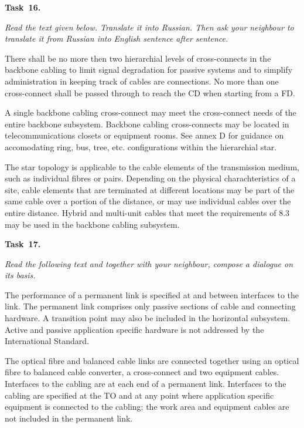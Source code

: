 {\bf Task~16.}~~{\it Read the text given below. Translate it into Russian. Then ask your neighbour to
translate it from Russian into English sentence after sentence. \par}

There shall be no more then two hierarchial levels of cross-connects in the backbone
cabling to limit signal degradation for passive systems and to simplify administration in keeping
track of cables are connections. No more than one cross-connect shall be passed through to reach
the CD when starting from a FD. \par

A single backbone cabling cross-connect may meet the cross-connect needs of the entire
backbone subsystem. Backbone cabling cross-connects may be located in telecommunications
closets or equipment rooms. See annex D for guidance on accomodating ring, bus, tree, etc.
configurations within the hierarchial star.\par

The star topology is applicable to the cable elements of the transmission medium, such as
individual fibres or pairs. Depending on the physical charachteristics of a site, cable elements that
are terminated at different locations may be part of the same cable over a portion of the distance, or
may use individual cables over the entire distance. Hybrid and multi-unit cables that meet the 
requirements of 8.3 may be used in the backbone cabling subsystem.\par

{\bf Task~17.}~~{\it Read the following text and together with your neighbour, compose a dialogue on its basis. \par}

The performance of a permanent link is specified at and between interfaces to the link. The
permanent link comprises only passive sections of cable and connecting hardware. A transition
point may also be included in the horizontal subsystem. Active and passive application specific
hardware is not addressed by the International Standard.\par

The optical fibre and balanced cable links are connected together using an optical fibre to
balanced cable converter, a cross-connect and two equipment cables. Interfaces to the cabling are at
each end of a permanent link. Interfaces to the cabling are specified at the TO and at any point
where application specific equipment is connected to the cabling; the work area and equipment
cables are not included in the permanent link.\par

